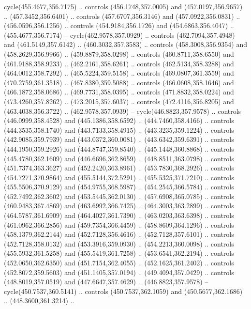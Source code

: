 \begin{scope}[cm={{1.25,0.0,0.0,-1.25,(0.0,743.43331)}}]
    cycle(455.4677,356.7175) .. controls (456.1748,357.0005) and
    (457.0197,356.9657) .. (457.3452,356.6401) .. controls (457.6707,356.3146) and
    (457.0922,356.0831) .. (456.0596,356.1256) .. controls (454.9184,356.1726) and
    (454.6863,356.4047) .. (455.4677,356.7174) -- cycle(462.9578,357.0929) ..
    controls (462.7094,357.4948) and (461.5149,357.6142) .. (460.3032,357.3583) ..
    controls (458.3008,356.9354) and (458.2629,356.9966) .. (459.8879,358.0298) ..
    controls (460.8711,358.6550) and (461.9188,358.9233) .. (462.2161,358.6261) ..
    controls (462.5134,358.3288) and (464.0012,358.7292) .. (465.5224,359.5158) ..
    controls (469.0807,361.3559) and (470.2759,361.3518) .. (467.8380,359.5088) ..
    controls (466.0608,358.1646) and (466.1872,358.0686) .. (469.7731,358.0395) ..
    controls (471.8832,358.0224) and (473.4260,357.8262) .. (473.2015,357.6037) ..
    controls (472.4116,356.8205) and (463.4038,356.3722) .. (462.9578,357.0939) --
    cycle(446.8823,357.9578) .. controls (446.0999,358.4528) and
    (445.1386,358.6592) .. (444.7460,358.4166) .. controls (444.3535,358.1740) and
    (443.7133,358.4915) .. (443.3235,359.1224) .. controls (442.9085,359.7939) and
    (443.0372,360.0081) .. (443.6342,359.6391) .. controls (444.1950,359.2926) and
    (444.8747,359.8540) .. (445.1448,360.8868) .. controls (445.4780,362.1609) and
    (446.6696,362.8659) .. (448.8511,363.0798) .. controls (451.7374,363.3627) and
    (452.2420,363.8961) .. (453.7830,368.2926) .. controls (454.7271,370.9864) and
    (455.5144,372.5291) .. (455.5325,371.7210) .. controls (455.5506,370.9129) and
    (454.9755,368.5987) .. (454.2545,366.5784) .. controls (452.7492,362.3602) and
    (453.5445,362.0130) .. (457.6908,365.0785) .. controls (460.9483,367.4869) and
    (463.6992,366.7425) .. (464.3003,363.2899) .. controls (464.5787,361.6909) and
    (464.4027,361.7390) .. (463.0203,363.6398) .. controls (461.0962,366.2856) and
    (459.7354,366.4459) .. (458.8609,364.1296) .. controls (458.1379,362.2144) and
    (452.7128,356.4616) .. (452.7128,357.6101) .. controls (452.7128,358.0132) and
    (453.3916,359.0930) .. (454.2213,360.0098) .. controls (455.5932,361.5258) and
    (455.5419,361.7258) .. (453.6541,362.2194) .. controls (452.0650,362.6350) and
    (451.7154,362.4055) .. (452.1625,361.2402) .. controls (452.8072,359.5603) and
    (451.1405,357.0194) .. (449.4094,357.0429) .. controls (448.8019,357.0519) and
    (447.6647,357.4629) .. (446.8823,357.9578) -- cycle(450.7537,360.5141) ..
    controls (450.7537,362.1059) and (450.5677,362.1686) .. (448.3600,361.3214) ..

\end{scope}
